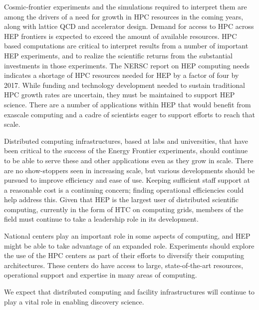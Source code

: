 Cosmic-frontier experiments and the simulations required to interpret them are among the drivers of a need for growth in HPC resources in the coming years, along with lattice QCD and accelerator design.  Demand for access to HPC across HEP frontiers is expected to exceed the amount of available resources.  HPC based computations are critical to interpret results from a number of important HEP experiments, and to realize the scientific returns from the substantial investments in those experiments.  The NERSC report on HEP computing needs indicates a shortage of HPC resources needed for HEP by a factor of four by 2017.  While funding and technology development needed to sustain traditional HPC growth rates are uncertain, they must be maintained to support HEP science.  There are a number of applications within HEP that would benefit from exascale computing and a cadre of scientists eager to support efforts to reach that scale.

Distributed computing infrastructures, based at labs and universities, that have been critical to the success of the Energy Frontier experiments, should continue to be able to serve these and other applications even as they grow in scale.  There are no show-stoppers seen in increasing scale, but various developments should be pursued to improve efficiency and ease of use.  Keeping sufficient staff support at a reasonable cost is a continuing concern; finding operational efficiencies could help address this.  Given that HEP is the largest user of distributed scientific computing, currently in the form of HTC on computing grids, members of the field must continue to take a leadership role in its development.

National centers play an important role in some aspects of computing, and HEP might be able to take advantage of an expanded role.  Experiments should explore the use of the HPC centers as part of their efforts to diversify their computing architectures.  These centers do have access to large, state-of-the-art resources, operational support and expertise in many areas of computing.

We expect that distributed computing and facility infrastructures will continue to play a vital role in enabling discovery science.

